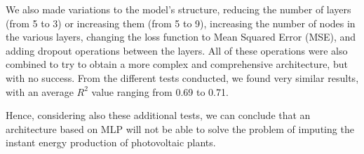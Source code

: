 We also made variations to the model's structure, reducing the number of layers (from 5 to 3) or increasing them (from 5 to 9), increasing the number of nodes in the various layers, changing the loss function to Mean Squared Error (MSE), and adding dropout operations between the layers. All of these operations were also combined to try to obtain a more complex and comprehensive architecture, but with no success. From the different tests conducted, we found very similar results, with an average $R^2$ value ranging from 0.69 to 0.71.

Hence, considering also these additional tests, we can  conclude that an architecture based on MLP will not be able to solve the problem of imputing the instant energy production of photovoltaic plants. %





